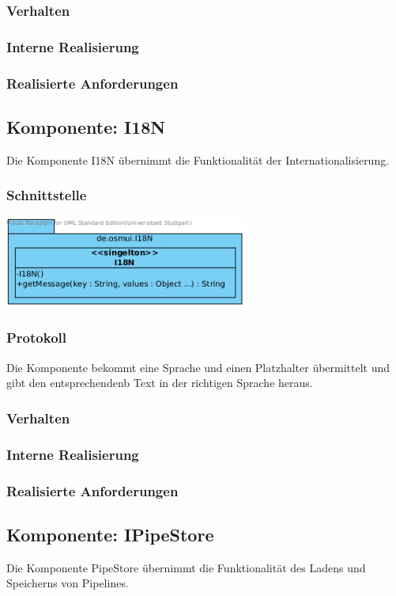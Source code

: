 \documentclass[a4paper,12pt]{scrartcl}
\begin{document}
\subsubsection{Verhalten}
\subsubsection{Interne Realisierung}
\subsubsection{Realisierte Anforderungen}

\subsection{Komponente: I18N}
Die Komponente I18N übernimmt die Funktionalität der Internationalisierung.
\subsubsection{Schnittstelle}
\begin{center}
\includegraphics[width=8cm]{Schnittstelle_I18N.png}
\end{center}
\subsubsection{Protokoll}
Die Komponente bekommt eine Sprache und einen Platzhalter übermittelt und gibt den entsprechendenb Text in der richtigen Sprache heraus.
\subsubsection{Verhalten}
\subsubsection{Interne Realisierung}
\subsubsection{Realisierte Anforderungen}

\subsection{Komponente: IPipeStore}
Die Komponente PipeStore übernimmt die Funktionalität des Ladens und Speicherns von Pipelines.
\end{document}
